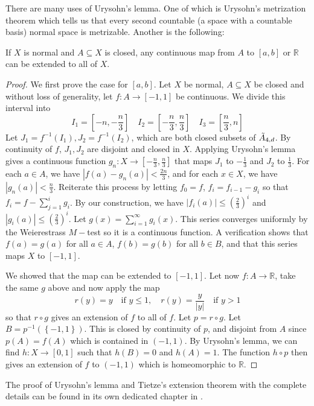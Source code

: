 \documentclass[12pt,reqno]{amsart}
\numberwithin{theorem}{section}
\theoremstyle{definition}
\theoremstyle{remark}
\numberwithin{equation}{section}
\newcommand{\A}{\Tilde{A}_{4,d}}
\newcommand{\set}[1]{\left \{ #1 \right \}}
\theoremstyle{definition}
\newcommand{\R}{\mathbb{R}}
\begin{document}
There are many uses of Urysohn's lemma. One of which is Urysohn's metrization theorem which tells us that every second countable (a space with a countable basis) normal space is metrizable. Another is the following:
\begin{corollary}
    If $X$ is normal and $A \subseteq X$ is closed, any continuous map from $A$ to $[a,b]$ or $\R$ can be extended to all of $X$.
\end{corollary}
\begin{proof}
    We first prove the case for $[a,b]$. Let $X$ be normal, $A\subseteq X$ be closed and without loss of generality, let $f:A\rightarrow [-1,1]$ be continuous. We divide this interval into 
    $$I_1 = \left [-n,-\frac n 3 \right ] \quad I_2 = \left [-\frac n 3 ,\frac n 3 \right ] \quad I_3 = \left [ \frac n 3,n\right ]$$
    Let $J_1 = f^{-1}(I_1),J_2=f^{-1}(I_2)$, which are both closed subsets of $\A$. By continuity of $f$, $J_1,J_2$ are disjoint and closed in $X$. Applying Urysohn's lemma gives a continuous function $g_n:X\rightarrow \left [-\frac n 3,\frac n 3 \right ]$ that maps $J_1$ to $-\frac 1 3$ and $J_2$ to $\frac 1 3$. For each $a \in A$, we have $|f(a)-g_n(a)|<\frac {2n} 3$, and for each $x \in X$, we have $|g_n(a)| < \frac n 3$. Reiterate this process by letting $f_0 = f$, $f_i=f_{i-1}-g_i$ so that $f_i = f-\sum_{j=1}^i g_i$. By our construction, we have $|f_i(a)| \leq \left (\frac 2 3 \right )^i$ and $|g_i(a)| \leq \left (\frac 2 3 \right )^i$. Let $g(x) = \sum_{i=1}^\infty g_i(x)$. This series converges uniformly by the Weierestrass $M-$test so it is a continuous function. A verification shows that $f(a)=g(a)$ for all $a \in A$, $f(b)=g(b) $ for all $b \in B$, and that this series maps $X$ to $[-1,1]$.

    We showed that the map can be extended to $[-1,1]$. Let now $f:A\rightarrow \R$, take the same $g$ above and now apply the map 
    $$r(y) = y \quad \text{if } y \leq 1 ,\quad r(y) = \frac{y}{|y|} \quad \text{if } y > 1$$
    so that $r\circ g$ gives an extension of $f$ to all of $f$. Let $p = r\circ g$. Let $B  = p^{-1}(\set{-1,1})$. This is closed by continuity of $p$, and disjoint from $A$ since $p(A)=f(A)$ which is contained in $(-1,1)$. By Urysohn's lemma, we can find $h:X\rightarrow [0,1]$ such that $h(B) = 0$ and $h(A) = 1$. The function $h\circ p$ then gives an extension of $f$ to $(-1,1)$ which is homeomorphic to $\R$.
\end{proof}
The proof of Urysohn's lemma and Tietze's extension theorem with the complete details can be found in its own dedicated chapter in \cite{munkres}.
\end{document}
